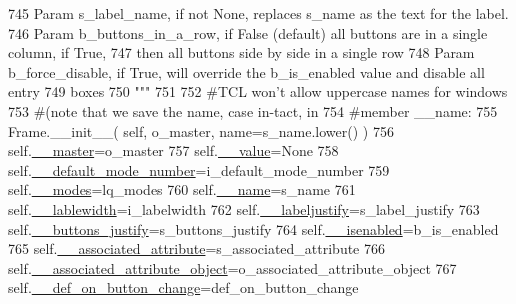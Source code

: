 \begin{DoxyCode}
745 \textcolor{stringliteral}{        Param s\_label\_name, if not None, replaces s\_name as the text for the label.}
746 \textcolor{stringliteral}{        Param b\_buttons\_in\_a\_row, if False (default) all buttons are in a single column, if True,}
747 \textcolor{stringliteral}{                then all buttons side by side in a single row}
748 \textcolor{stringliteral}{        Param b\_force\_disable, if True, will override the b\_is\_enabled value and disable all entry }
749 \textcolor{stringliteral}{              boxes}
750 \textcolor{stringliteral}{        """}
751 
752         \textcolor{comment}{#TCL won't allow uppercase names for windows}
753         \textcolor{comment}{#(note that we save the name, case in-tact, in}
754         \textcolor{comment}{#member \_\_name:}
755         Frame.\_\_init\_\_( self, o\_master, name=s\_name.lower() )
756         self.\hyperlink{classnegui_1_1pgguiutilities_1_1KeyCategoricalValueFrame_ad0cd6c8b8265cb6b27efa7bbc5e23ae0}{\_\_master}=o\_master
757         self.\hyperlink{classnegui_1_1pgguiutilities_1_1KeyCategoricalValueFrame_ac743c18f66b310548e2dd0e3076b00c7}{\_\_value}=\textcolor{keywordtype}{None}
758         self.\hyperlink{classnegui_1_1pgguiutilities_1_1KeyCategoricalValueFrame_ae5f2855d8f22b4aa8f533023ac3e7fb4}{\_\_default\_mode\_number}=i\_default\_mode\_number
759         self.\hyperlink{classnegui_1_1pgguiutilities_1_1KeyCategoricalValueFrame_aadb3b6381c9159d303cd150e5a748096}{\_\_modes}=lq\_modes
760         self.\hyperlink{classnegui_1_1pgguiutilities_1_1KeyCategoricalValueFrame_a92a1947d6110ada3bd813cc8e84d84ad}{\_\_name}=s\_name
761         self.\hyperlink{classnegui_1_1pgguiutilities_1_1KeyCategoricalValueFrame_adf2c2370358ac051464aef108d75caa3}{\_\_lablewidth}=i\_labelwidth
762         self.\hyperlink{classnegui_1_1pgguiutilities_1_1KeyCategoricalValueFrame_a96cbcef967bddfd5035b827c0ae50c05}{\_\_labeljustify}=s\_label\_justify
763         self.\hyperlink{classnegui_1_1pgguiutilities_1_1KeyCategoricalValueFrame_a1fa18274aa53997c8b5fe446779b9a9d}{\_\_buttons\_justify}=s\_buttons\_justify
764         self.\hyperlink{classnegui_1_1pgguiutilities_1_1KeyCategoricalValueFrame_afb2be50b6de2bac5c96b9d73d93da416}{\_\_isenabled}=b\_is\_enabled
765         self.\hyperlink{classnegui_1_1pgguiutilities_1_1KeyCategoricalValueFrame_aa9b8f1b85890b51192559ff142d2360f}{\_\_associated\_attribute}=s\_associated\_attribute
766         self.\hyperlink{classnegui_1_1pgguiutilities_1_1KeyCategoricalValueFrame_a14174765fdf3479d1f7f09fe1deda5cf}{\_\_associated\_attribute\_object}=o\_associated\_attribute\_object
767         self.\hyperlink{classnegui_1_1pgguiutilities_1_1KeyCategoricalValueFrame_a0e462eacf72e4afb9711c917fe1c0d6a}{\_\_def\_on\_button\_change}=def\_on\_button\_change

\end{DoxyCode}
